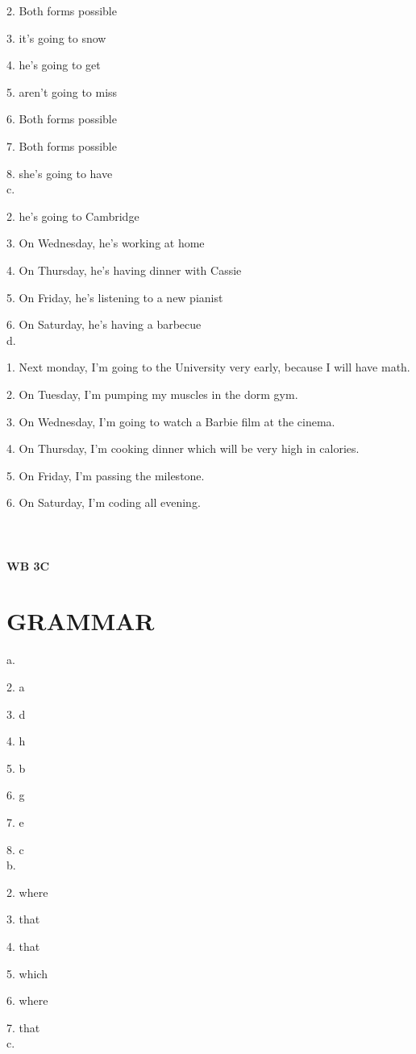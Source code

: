 \documentclass{article}
\begin{document}
2. Both forms possible

3. it's going to snow

4. he's going to get

5. aren't going to miss

6. Both forms possible

7. Both forms possible

8. she's going to have 
\\
c.

2. he's going to Cambridge

3. On Wednesday, he's working at home

4. On Thursday, he's having dinner with Cassie

5. On Friday, he's listening to a new pianist

6. On Saturday, he's having a barbecue
\\
d.

1. Next monday, I'm going to the University very early, because I will have math.

2. On Tuesday, I'm pumping my muscles in the dorm gym.

3. On Wednesday, I'm going to watch a Barbie film at the cinema.

4. On Thursday, I'm cooking dinner which will be very high in calories.

5. On Friday, I'm passing the milestone.

6. On Saturday, I'm coding all evening.
\\ \\
\\ \\
\textbf{WB 3C}
\section*{GRAMMAR}
a. 

2. a

3. d

4. h

5. b

6. g

7. e

8. c 
\\
b. 

2. where

3. that

4. that

5. which

6. where

7. that
\\
c.
\end{document}
